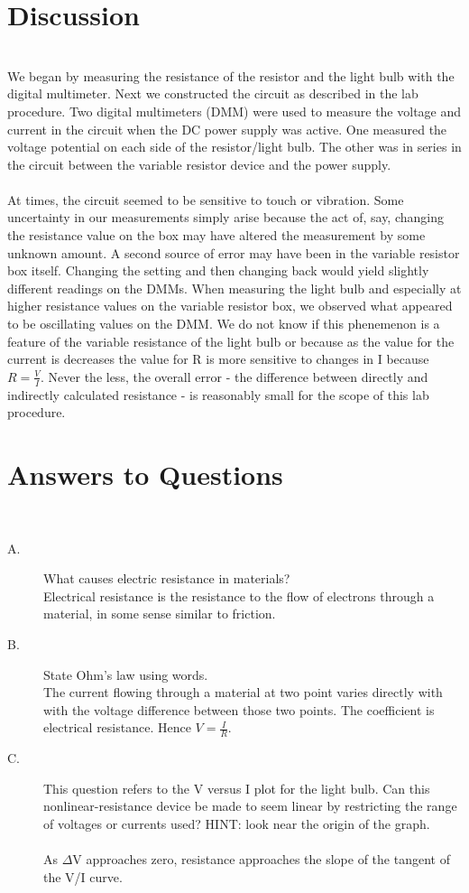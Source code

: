 \documentclass{article}
\begin{document}
\section{Discussion}\hfill\\
We began by measuring the resistance of the resistor and the light bulb with the digital multimeter.  Next we constructed the circuit as described in the lab procedure.  Two digital multimeters (DMM) were used to measure the voltage and current in the circuit when the DC power supply was active.  One measured the voltage potential on each side of the resistor/light bulb.  The other was in series in the circuit between the variable resistor device and the power supply.  \\ \\
At times, the circuit seemed to be sensitive to touch or vibration.  Some uncertainty in our measurements simply arise because the act of, say, changing the resistance value on the box may have altered the measurement by some unknown amount.  A second source of error may have been in the variable resistor box itself.  Changing the setting and then changing back would yield slightly different readings on the DMMs.  When measuring the light bulb and especially at higher resistance values on the variable resistor box, we observed what appeared to be oscillating values on the DMM.  We do not know if this phenemenon is a feature of the variable resistance of the light bulb or because as the value for the current is decreases the value for R is more sensitive to changes in I because $R=\frac{V}{I}$.  Never the less, the overall error - the difference between directly and indirectly calculated resistance - is reasonably small for the scope of this lab procedure.
\section{Answers to Questions}\hfill\\
\begin{description}
\item[A.] What causes electric resistance in materials? \hfill\\
Electrical resistance is the resistance to the flow of electrons through a material, in some sense similar to friction.  
\item[B.] State Ohm's law using words. \hfill\\
The current flowing through a material at two point varies directly with with the voltage difference between those two points.  The coefficient is electrical resistance.  Hence $V = \frac{I}{R}$.
\item[C.] This question refers to the V versus I plot for the light bulb.  Can this nonlinear-resistance device be made to seem linear by restricting the range of voltages or currents used?  HINT: look near the origin of the graph. \hfill\\\\
As $\Delta$V approaches zero, resistance approaches the slope of the tangent of the V/I curve.
\end{description}
\end{document}
